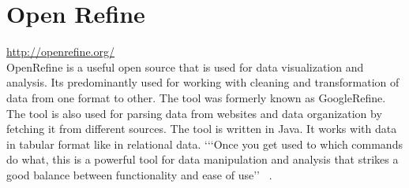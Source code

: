 \section{Open Refine}
\url{http://openrefine.org/} \\

OpenRefine is a useful open source that is used for data visualization and analysis. 
Its predominantly used for working with cleaning and transformation of data from one format to other.
The tool was formerly known as GoogleRefine. The tool is also used for parsing data from websites and data organization
by fetching it from different sources. The tool is written in Java. It works with data in tabular format like in relational data.
`‘‘Once you get used to which commands do what, this is a powerful tool for data manipulation and analysis
that strikes a good balance between functionality and ease of use’’ ~\cite{hid-sp18-417-openrefine}.


